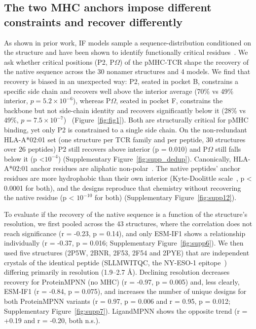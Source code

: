 \documentclass{article}
\begin{document}
\subsection{The two MHC anchors impose different constraints and recover differently}
\label{sec:recovery}
As shown in prior work, IF models sample a sequence-distribution conditioned on the structure and have been shown to identify functionally critical residues~\citep{dauparas2022proteinmpnn,hsu2022esmif,ribeirofilho2024exploring,deng2025stabddg,luo2023rde}. We ask whether critical positions (P2, P$\Omega$) of the pMHC-TCR shape the recovery of the native sequence across the 30 nonamer structures and 4 models. We find that recovery is biased in an unexpected way: P2, seated in pocket B, constrains a specific side chain and recovers well above the interior average (70\% vs 49\% interior, $p=5.2\times10^{-6}$), whereas P$\Omega$, seated in pocket F, constrains the backbone but not side-chain identity and recovers significantly below it (28\% vs 49\%, $p=7.5\times10^{-7}$)~\citep{falk1991allele,madden1995three} (Figure~\ref{fig:fig1}). Both are structurally critical for pMHC binding, yet only P2 is constrained to a single side chain. On the non-redundant HLA-A*02:01 set (one structure per TCR family and per peptide, 30 structures over 26 peptides) P2 still recovers above interior (p = 0.010) and P$\Omega$ still falls below it (p <$10^{-4}$) (Supplementary Figure~\ref{fig:supp_dedup}). Canonically, HLA-A*02:01 anchor residues are aliphatic non-polar~\citep{rammensee1999syfpeithi}. The native peptides' anchor residues are more hydrophobic than their own interior (Kyte-Doolittle scale~\citep{kyte1982simple}, p < 0.0001 for both), and the designs reproduce that chemistry without recovering the native residue (p < $10^{-10}$ for both) (Supplementary Figure~\ref{fig:supp12}).


To evaluate if the recovery of the native sequence is a function of the structure's resolution, we first pooled across the 43 structures, where the correlation does not reach significance (r = -0.23, p = 0.14), and only ESM-IF1 shows a relationship individually (r = -0.37, p = 0.016; Supplementary Figure~\ref{fig:supp6}). We then used five structures (2P5W, 2BNR, 2F53, 2F54 and 2PYE) that are independent crystals of the identical peptide (SLLMWITQC, the NY-ESO-1 epitope~\citep{chen2005structural,sami2007high}) differing primarily in resolution (1.9--2.7 \AA{}). Declining resolution decreases recovery for ProteinMPNN (no MHC) (r = -0.97, p = 0.005) and, less clearly, ESM-IF1 (r = -0.84, p = 0.075), and increases the number of unique designs for both ProteinMPNN variants (r = 0.97, p = 0.006 and r = 0.95, p = 0.012; Supplementary Figure~\ref{fig:supp7}). LigandMPNN shows the opposite trend (r = +0.19 and r = -0.20, both n.s.).
\end{document}
